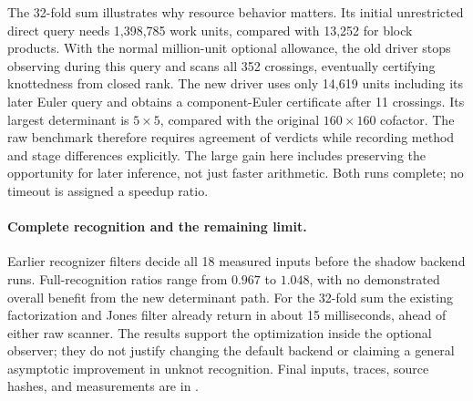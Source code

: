 The 32-fold sum illustrates why resource behavior matters.  Its initial
unrestricted direct query needs 1,398,785 work units, compared with 13,252
for block products.  With the normal million-unit optional allowance,
the old driver stops observing during this query and scans all 352
crossings, eventually certifying knottedness from closed rank.  The new
driver uses only 14,619 units including its later Euler query and obtains
a component-Euler certificate after 11 crossings.  Its largest determinant
is $5\times5$, compared with the original $160\times160$ cofactor.
The raw benchmark therefore requires agreement of verdicts while recording
method and stage differences explicitly.  The large gain here includes
preserving the opportunity for later inference, not just faster arithmetic.
Both runs complete; no timeout is assigned a speedup ratio.

\paragraph{Complete recognition and the remaining limit.}
Earlier recognizer filters decide all 18 measured inputs before the shadow
backend runs.  Full-recognition ratios range from $0.967$ to $1.048$, with
no demonstrated overall benefit from the new determinant path.  For the
32-fold sum the existing factorization and Jones filter already return in
about 15 milliseconds, ahead of either raw scanner.  The results support
the optimization inside the optional observer; they do not justify changing
the default backend or claiming a general asymptotic improvement in unknot
recognition.  Final inputs, traces, source hashes, and measurements are in
.

